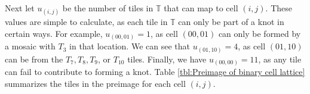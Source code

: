 \documentclass[12pt]{article}
\theoremstyle{plain}
\theoremstyle{definition}
\theoremstyle{remark}
\theoremstyle{definition}
\newcommand{\lablnode}[3]{\node[shape=circle,draw=none,fill=none, inner sep=0pt,minimum size=5pt] (A) at ( #1 , #2 ) {#3};}
\newcommand{\lablvertex}[3]{\node[shape=circle,draw=none,fill=white, inner sep=2pt,minimum size=5pt] (A) at ( #1 , #2 ) {#3};}
\begin{document}
\begin{center}
\end{center}

Next let $u_{(i,j)}$ be the number of tiles in $\mathbb{T}$ that can map to cell $(i,j)$. These values are simple to calculate, as each tile in $\mathbb{T}$ can only be part of a knot in certain ways. For example, $u_{(00, 01)} = 1$, as cell $(00,01)$ can only be formed by a mosaic with $T_3$ in that location. We can see that $u_{(01,10)}=4$, as cell $(01,10)$ can be from the $T_7,T_8,T_9$, or $T_{10}$ tiles. Finally, we have $u_{(00,00)}=11$, as any tile can fail to contribute to forming a knot. Table \ref{tbl:Preimage of binary cell lattice} summarizes the tiles in the preimage for each cell $(i,j)$. 
\end{document}
